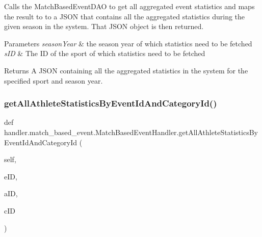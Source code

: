 Calls the Match\+Based\+Event\+D\+AO to get all aggregated event statistics and maps the result to to a J\+S\+ON that contains all the aggregated statistics during the given season in the system. That J\+S\+ON object is then returned.


\begin{DoxyParams}{Parameters}
{\em season\+Year} & the season year of which statistics need to be fetched \\
\hline
{\em s\+ID} & The ID of the sport of which statistics need to be fetched\\
\hline
\end{DoxyParams}
\begin{DoxyReturn}{Returns}
A J\+S\+ON containing all the aggregated statistics in the system for the specified sport and season year. 
\end{DoxyReturn}
\mbox{\label{classhandler_1_1match__based__event_1_1_match_based_event_handler_a80e0ef9c6ac143b78ab200c0e84511d9}} 
\subsubsection{\texorpdfstring{get\+All\+Athlete\+Statistics\+By\+Event\+Id\+And\+Category\+Id()}{getAllAthleteStatisticsByEventIdAndCategoryId()}}
{\footnotesize\ttfamily def handler.\+match\+\_\+based\+\_\+event.\+Match\+Based\+Event\+Handler.\+get\+All\+Athlete\+Statistics\+By\+Event\+Id\+And\+Category\+Id (\begin{DoxyParamCaption}\item[{}]{self,  }\item[{}]{e\+ID,  }\item[{}]{a\+ID,  }\item[{}]{c\+ID }\end{DoxyParamCaption})}



